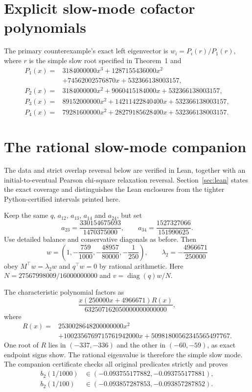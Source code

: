 \documentclass[11pt]{article}
\newcommand{\diag}{\operatorname{diag}}
\begin{document}
\section{Explicit slow-mode cofactor polynomials}\label{app:cofactors}
The primary counterexample's exact left eigenvector is $w_i=P_i(r)/P_1(r)$, where $r$ is the simple slow root specified in Theorem~1 and
\begin{align*}
P_1(x)={}&3184000000x^3+1287155436000x^2\\
&+74562002576870x+532366138003157,\\
P_2(x)={}&3184000000x^2+9060415184000x+532366138003157,\\
P_3(x)={}&89152000000x^2+14211422840400x+532366138003157,\\
P_4(x)={}&79281600000x^2+28279185628400x+532366138003157.
\end{align*}

\section{The rational slow-mode companion}\label{app:rational}
The data and strict overlap reversal below are verified in Lean, together with an initial-to-eventual Pearson chi-square relaxation reversal. Section~\ref{sec:lean} states the exact coverage and distinguishes the Lean enclosures from the tighter Python-certified intervals printed here.

Keep the same $q$, $a_{12}$, $a_{13}$, $a_{14}$ and $a_{24}$, but set
\[
a_{23}=\frac{330154675693}{1470375000},\qquad
 a_{34}=\frac{1527327066}{151990625}.
\]
Use detailed balance and conservative diagonals as before. Then
\[
w=\left(1,-\frac{759}{1000},-\frac{48957}{80000},-\frac1{250}\right),
\qquad \lambda_2=-\frac{4966671}{250000}
\]
obey $M^\top w=\lambda_2w$ and $q^\top w=0$ by rational arithmetic. Here $N=27567998009/16000000000$ and $v=\diag(q)w/N$.

The characteristic polynomial factors as
\[
\frac{x(250000x+4966671)R(x)}{632507162050000000000000},
\]
where
\begin{align*}
R(x)={}&2530028648200000000x^2\\
&+1002356769715761942000x+50981800562345565497767.
\end{align*}
One root of $R$ lies in $(-337,-336)$ and the other in $(-60,-59)$, as exact endpoint signs show. The rational eigenvalue is therefore the simple slow mode. The companion certificate checks all original predicates strictly and proves
\begin{align*}
b_2(1/1000)&\in(-0.093755177882,-0.093755177881),\\
b_2(1/100)&\in(-0.093857287853,-0.093857287852).
\end{align*}
\end{document}
